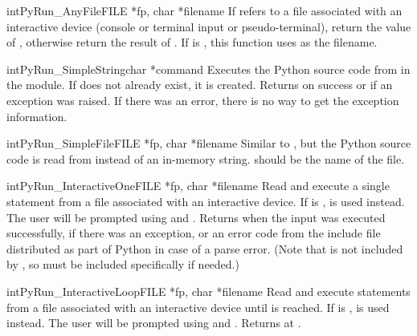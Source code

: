 \documentclass{manual}
\begin{document}
\begin{cfuncdesc}{int}{PyRun_AnyFile}{FILE *fp, char *filename}
  If  refers to a file associated with an interactive device
  (console or terminal input or \UNIX{} pseudo-terminal), return the
  value of , otherwise return the
  result of .  If  is
  \NULL{}, this function uses  as the filename.
\end{cfuncdesc}

\begin{cfuncdesc}{int}{PyRun_SimpleString}{char *command}
  Executes the Python source code from  in the
   module.  If  does not already
  exist, it is created.  Returns  on success or  if
  an exception was raised.  If there was an error, there is no way to
  get the exception information.
\end{cfuncdesc}

\begin{cfuncdesc}{int}{PyRun_SimpleFile}{FILE *fp, char *filename}
  Similar to , but the Python source
  code is read from  instead of an in-memory string.
   should be the name of the file.
\end{cfuncdesc}

\begin{cfuncdesc}{int}{PyRun_InteractiveOne}{FILE *fp, char *filename}
  Read and execute a single statement from a file associated with an
  interactive device.  If  is \NULL,  is
  used instead.  The user will be prompted using  and
  .  Returns  when the input was executed
  successfully,  if there was an exception, or an error code
  from the  include file distributed as part of Python
  in case of a parse error.  (Note that  is not
  included by , so must be included specifically if
  needed.)
\end{cfuncdesc}

\begin{cfuncdesc}{int}{PyRun_InteractiveLoop}{FILE *fp, char *filename}
  Read and execute statements from a file associated with an
  interactive device until \EOF{} is reached.  If  is
  \NULL,  is used instead.  The user will be prompted
  using  and .  Returns  at \EOF.
\end{cfuncdesc}
\end{document}
